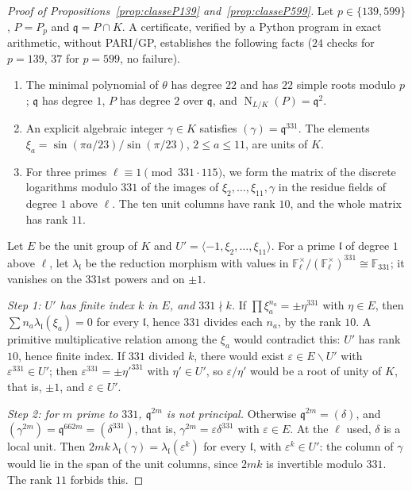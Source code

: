 \documentclass[11pt,a4paper]{amsart}
\theoremstyle{plain}
\theoremstyle{definition}
\numberwithin{equation}{section}
\newcommand{\F}{\mathbb{F}}
\newcommand{\q}{\mathfrak{q}}
\DeclareMathOperator{\Nm}{N}
\begin{document}
\begin{proof}[Proof of Propositions~\ref{prop:classeP139} and~\ref{prop:classeP599}]
Let $p\in\{139,599\}$, $P=P_p$ and $\q=P\cap K$. A certificate, verified by a Python program in exact arithmetic, without PARI/GP, establishes the following facts ($24$ checks for $p=139$, $37$ for $p=599$, no failure).
\begin{enumerate}[label=\textup{(\roman*)}]
\item The minimal polynomial of $\theta$ has degree $22$ and has $22$ simple roots modulo $p$; $\q$ has degree $1$, $P$ has degree $2$ over $\q$, and $\Nm_{L/K}(P)=\q^2$.
\item An explicit algebraic integer $\gamma\in K$ satisfies $(\gamma)=\q^{331}$. The elements $\xi_a=\sin(\pi a/23)/\sin(\pi/23)$, $2\le a\le11$, are units of $K$.
\item For three primes $\ell\equiv1\pmod{331\cdot115}$, we form the matrix of the discrete logarithms modulo $331$ of the images of $\xi_2,\dots,\xi_{11},\gamma$ in the residue fields of degree $1$ above $\ell$. The ten unit columns have rank $10$, and the whole matrix has rank $11$.
\end{enumerate}
Let $E$ be the unit group of $K$ and $U'=\langle-1,\xi_2,\dots,\xi_{11}\rangle$. For a prime $\mathfrak l$ of degree $1$ above $\ell$, let $\lambda_{\mathfrak l}$ be the reduction morphism with values in $\F_\ell^\times/(\F_\ell^\times)^{331}\cong\F_{331}$; it vanishes on the $331$st powers and on $\pm1$.

\emph{Step 1: $U'$ has finite index $k$ in $E$, and $331\nmid k$.} If $\prod\xi_a^{n_a}=\pm\eta^{331}$ with $\eta\in E$, then $\sum n_a\lambda_{\mathfrak l}(\xi_a)=0$ for every $\mathfrak l$, hence $331$ divides each $n_a$, by the rank $10$. A primitive multiplicative relation among the $\xi_a$ would contradict this: $U'$ has rank $10$, hence finite index. If $331$ divided $k$, there would exist $\varepsilon\in E\smallsetminus U'$ with $\varepsilon^{331}\in U'$; then $\varepsilon^{331}=\pm\eta'^{331}$ with $\eta'\in U'$, so $\varepsilon/\eta'$ would be a root of unity of $K$, that is, $\pm1$, and $\varepsilon\in U'$.

\emph{Step 2: for $m$ prime to $331$, $\q^{2m}$ is not principal.} Otherwise $\q^{2m}=(\delta)$, and $(\gamma^{2m})=\q^{662m}=(\delta^{331})$, that is, $\gamma^{2m}=\varepsilon\delta^{331}$ with $\varepsilon\in E$. At the $\ell$ used, $\delta$ is a local unit. Then $2mk\,\lambda_{\mathfrak l}(\gamma)=\lambda_{\mathfrak l}(\varepsilon^k)$ for every $\mathfrak l$, with $\varepsilon^k\in U'$: the column of $\gamma$ would lie in the span of the unit columns, since $2mk$ is invertible modulo $331$. The rank $11$ forbids this.


\end{proof}
\end{document}
